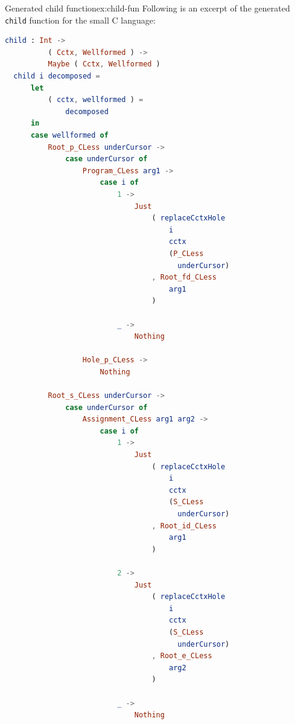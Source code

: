 \begin{example}{Generated child function}{ex:child-fun}
  Following is an excerpt of the generated \texttt{child} function
  for the small C language:
  \begin{lstlisting}[language=elm,style=inline,backgroundcolor=\color{myexamplecolorback}]
  child : Int -> 
          ( Cctx, Wellformed ) -> 
          Maybe ( Cctx, Wellformed )
  child i decomposed =
      let
          ( cctx, wellformed ) =
              decomposed
      in
      case wellformed of
          Root_p_CLess underCursor ->
              case underCursor of
                  Program_CLess arg1 ->
                      case i of
                          1 ->
                              Just
                                  ( replaceCctxHole 
                                      i 
                                      cctx 
                                      (P_CLess 
                                        underCursor)
                                  , Root_fd_CLess 
                                      arg1
                                  )
  
                          _ ->
                              Nothing
  
                  Hole_p_CLess ->
                      Nothing
  
          Root_s_CLess underCursor ->
              case underCursor of
                  Assignment_CLess arg1 arg2 ->
                      case i of
                          1 ->
                              Just
                                  ( replaceCctxHole 
                                      i 
                                      cctx 
                                      (S_CLess 
                                        underCursor)
                                  , Root_id_CLess 
                                      arg1
                                  )
  
                          2 ->
                              Just
                                  ( replaceCctxHole 
                                      i 
                                      cctx 
                                      (S_CLess 
                                        underCursor)
                                  , Root_e_CLess 
                                      arg2
                                  )
  
                          _ ->
                              Nothing
\end{lstlisting}
\end{example}

